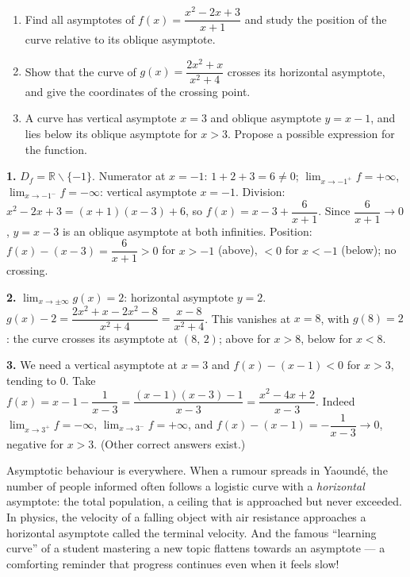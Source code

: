 \documentclass[11pt]{article}
\def\setminus{\mathbin{\backslash}}\let\smallsetminus\setminus
\begin{document}
\begin{exercice}[Practice]
\begin{enumerate}
\item Find all asymptotes of $f(x)=\dfrac{x^{2}-2x+3}{x+1}$ and study the position of the curve relative to its oblique asymptote.
\item Show that the curve of $g(x)=\dfrac{2x^{2}+x}{x^{2}+4}$ crosses its horizontal asymptote, and give the coordinates of the crossing point.
\item A curve has vertical asymptote $x=3$ and oblique asymptote $y=x-1$, and lies below its oblique asymptote for $x>3$. Propose a possible expression for the function.
\end{enumerate}
\end{exercice}

\begin{corrige}[Exercise 1]
\textbf{1.} $D_f=\mathbb{R}\setminus\{-1\}$. Numerator at $x=-1$: $1+2+3=6\neq 0$; $\lim_{x\to -1^{+}}f=+\infty$, $\lim_{x\to -1^{-}}f=-\infty$: vertical asymptote $x=-1$. Division: $x^{2}-2x+3=(x+1)(x-3)+6$, so $f(x)=x-3+\dfrac{6}{x+1}$. Since $\dfrac{6}{x+1}\to 0$, $y=x-3$ is an oblique asymptote at both infinities. Position: $f(x)-(x-3)=\dfrac{6}{x+1}>0$ for $x>-1$ (above), $<0$ for $x<-1$ (below); no crossing.

\textbf{2.} $\lim_{x\to\pm\infty}g(x)=2$: horizontal asymptote $y=2$. $g(x)-2=\dfrac{2x^{2}+x-2x^{2}-8}{x^{2}+4}=\dfrac{x-8}{x^{2}+4}$. This vanishes at $x=8$, with $g(8)=2$: the curve crosses its asymptote at $(8,\,2)$; above for $x>8$, below for $x<8$.

\textbf{3.} We need a vertical asymptote at $x=3$ and $f(x)-(x-1)<0$ for $x>3$, tending to $0$. Take $f(x)=x-1-\dfrac{1}{x-3}=\dfrac{(x-1)(x-3)-1}{x-3}=\dfrac{x^{2}-4x+2}{x-3}$. Indeed $\lim_{x\to 3^{+}}f=-\infty$, $\lim_{x\to 3^{-}}f=+\infty$, and $f(x)-(x-1)=-\dfrac{1}{x-3}\to 0$, negative for $x>3$. (Other correct answers exist.)
\end{corrige}

\begin{savaistu}
Asymptotic behaviour is everywhere. When a rumour spreads in Yaoundé, the number of people informed often follows a logistic curve with a \emph{horizontal} asymptote: the total population, a ceiling that is approached but never exceeded. In physics, the velocity of a falling object with air resistance approaches a horizontal asymptote called the terminal velocity. And the famous ``learning curve'' of a student mastering a new topic flattens towards an asymptote — a comforting reminder that progress continues even when it feels slow!
\end{savaistu}
\end{document}
